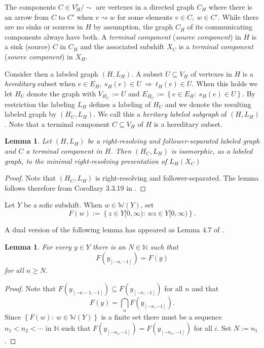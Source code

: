\documentclass[12pt,oneside,english]{amsart}
\newtheorem{lemma}[thm]{Lemma}
\begin{document}
 The components $C \in V_H^r/\sim$ are vertexes in a directed graph $C_H$ where there is an arrow from $C$ to $C'$ when $v \rightsquigarrow w$ for some elements $v\in C, \ w \in C'$. While there are no sinks or sources in $H$ by assumption, the graph $C_H$ of its communicating components always have both. A \emph{terminal component} (\emph{source component}) in $H$ is a sink (source) $C$ in $C_H$ and the associated subshift $X_C$ is a \emph{terminal component} (\emph{source component}) in $X_H$. 


Consider then a labeled graph $(H,L_H)$. A subset $U \subseteq V_H$ of vertexes in $H$ is a \emph{hereditary} subset when $e \in E_H, \ s_H(e) \in U \ \Rightarrow \ t_H(e) \in U$. When this holds we let $H_U$ denote the graph with $V_{H_U} := U$ and $E_{H_U} := \left\{ e\in E_H: \ s_H(e) \in U\right\}$. By restriction the labeling $L_H$ defines a labeling of $H_U$ and we denote the resulting labeled graph by $(H_U,L_H)$. We call this a \emph{heritary labeled subgraph} of $(H,L_H)$. Note that a terminal component $C \subseteq V_H$ of $H$ is a hereditary subset.





\begin{lemma}\label{01-10-25} Let $(H,L_H)$ be a right-resolving and follower-separated labeled graph and $C$ a terminal component in $H$. Then $(H_C,L_H)$ is isomorphic, as a labeled graph, to the minimal right-resolving presentation of $L_H(X_C)$
\end{lemma}
\begin{proof} Note that $(H_C,L_H)$ is  right-resolving and follower-separated. The lemma follows therefore from Corollary 3.3.19 in \cite{LM}. 
\end{proof}

Let $Y$ be a sofic subshift.
When $w \in \mathbb W(Y)$, set
$$
F(w) := \left\{z \in Y[0,\infty): \ wz \in Y[0,\infty) \right\} .
$$

A dual version of the following lemma has appeared as Lemma 4.7 of \cite{J}.

\begin{lemma}\label{27e-09-25} For every $y \in Y$ there is an $N \in \mathbb N$ such that 
$$
F(y_{[-n,-1]})= F(y)
$$
for all $n \geq N$.
\end{lemma}
\begin{proof} Note that $F(y_{[-n-1,-1]}) \subseteq F(y_{[-n,-1]})$ for all $n$ and that
$$
F(y) = \bigcap_n F(y_{[-n,-1]}) .
$$
Since $\left\{F(w) : \ w \in \mathbb W(Y)\right\}$ is a finite set there must be a sequence $n_1 < n_2 < \cdots$ in $\mathbb N$ such that $F(y_{[-n_i,-1]}) =F(y_{[-n_1,-1]})$ for all $i$. Set $N := n_1$. 
\end{proof}
\end{document}
